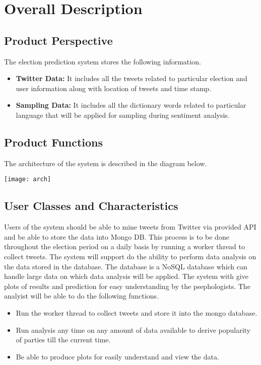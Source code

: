 \documentclass{scrreprt}
\begin{document}
\chapter{Overall Description}

\section{Product Perspective}
The election prediction system stores the following information.
\begin{itemize}
	\item \textbf{Twitter Data: } It includes all the tweets related to particular election and user information along with location of tweets and time stamp.
	
	\item \textbf{Sampling Data: } It includes all the dictionary words related to particular language that will be applied for sampling during sentiment analysis.
\end{itemize}

\section{Product Functions}
The architecture of the system is described in the diagram below. \\

\begin{center}
\texttt{[image: arch]}\\
\end{center}

\section{User Classes and Characteristics}

Users of the system should be able to mine tweets from Twitter via provided API and be able to store the data into Mongo DB. This process is to be done throughout the election period on a daily basis by running a worker thread to collect tweets. The system will support do the ability to perform data analysis on the data stored in the database. The database is a NoSQL database which can handle large data on which data analysis will be applied. The system with give plots of results and prediction for easy understanding by the psephologists. The analyist will be able to do the following functions.

\begin{itemize}
	\item Run the worker thread to collect tweets and store it into the mongo database.
	\item Run analysis any time on any amount of data available to derive popularity of parties till the current time.
	\item Be able to produce plots for easily understand and view the data.
\end{itemize}
\end{document}
